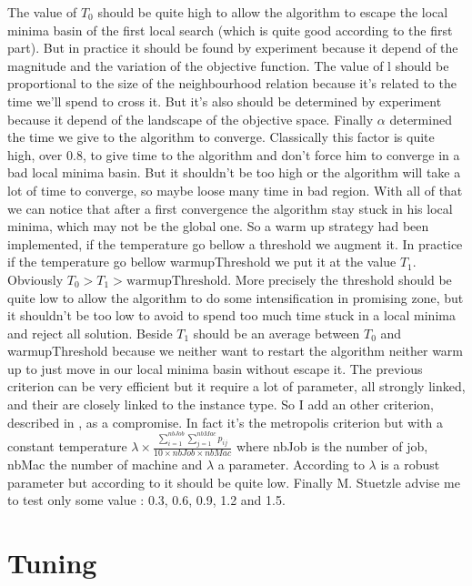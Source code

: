 \documentclass[12pt,a4paper]{article}
\begin{document}
The value of $T_0$ should be quite high to allow the algorithm to escape the local minima basin of the first local search (which is quite good according to the first part). But in practice it should be found by experiment because it depend of the magnitude and the variation of the objective function. The value of l should be proportional to the size of the neighbourhood relation because it's related to the time we'll spend to cross it. But it's also should be determined by experiment because it depend of the landscape of the objective space. Finally $\alpha$ determined the time we give to the algorithm to converge. Classically this factor is quite high, over $0.8$, to give time to the algorithm and don't force him to converge in a bad local minima basin. But it shouldn't be too high or the algorithm will take a lot of time to converge, so maybe loose many time in bad region. With all of that we can notice that after a first convergence the algorithm stay stuck in his local minima, which may not be the global one. So a warm up strategy had been implemented, if the temperature go bellow a threshold we augment it. In practice if the temperature go bellow warmupThreshold we put it at the value $T_1$. Obviously $T_0 > T_1 > \text{warmupThreshold}$. More precisely the threshold should be quite low to allow the algorithm to do some intensification in promising zone, but it shouldn't be too low to avoid to spend too much time stuck in a local minima and reject all solution. Beside $T_1$ should be an average between $T_0$ and warmupThreshold because we neither want to restart the algorithm neither warm up to just move in our local minima basin without escape it. The previous criterion can be very efficient but it require a lot of parameter, all strongly linked, and their are closely linked to the instance type. So I add an other criterion, described in \cite{Ruiz06asimple}, as a compromise. In fact it's the metropolis criterion but with a constant temperature $\lambda \times \frac{\sum \limits_{i = 1}^{nbJob} \sum \limits_{j=1}^{nbMac} p_{ij} }{10 \times nbJob \times nbMac}$ where nbJob is the number of job, nbMac the number of machine and $\lambda$ a parameter. According to \cite{Pan201231} $\lambda$ is a robust parameter but according to \cite{Ruiz06asimple} it should be quite low. Finally M. Stuetzle advise me to test only some value : 0.3, 0.6, 0.9, 1.2 and 1.5.
 
\section{Tuning}
\end{document}
